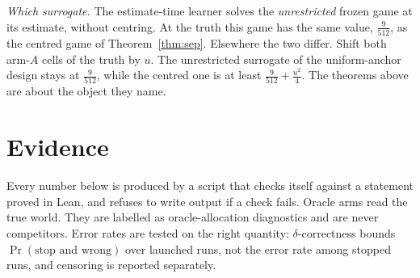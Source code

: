 \emph{Which surrogate.} The estimate-time learner solves the \emph{unrestricted} frozen game at
its estimate, without centring. At the truth this game has the same value, $\frac{9}{512}$, as
the centred game of Theorem~\ref{thm:sep}. Elsewhere the two differ. Shift both arm-$A$ cells
of the truth by $u$. The unrestricted surrogate of the uniform-anchor design stays at
$\frac{9}{512}$, while the centred one is at least $\frac{9}{512}+\frac{u^{2}}{4}$. The
theorems above are about the object they name.


\section{Evidence}
\label{sec:evidence}

Every number below is produced by a script that checks itself against a statement proved in
Lean, and refuses to write output if a check fails. Oracle arms read the true world. They are
labelled as oracle-allocation diagnostics and are never competitors. Error rates are tested on
the right quantity: $\delta$-correctness bounds $\Pr(\text{stop and wrong})$ over launched runs,
not the error rate among stopped runs, and censoring is reported separately.

